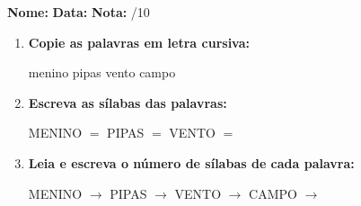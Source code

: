 \begin{exercicio}



\noindent\textbf{Nome:} \underline{\hspace{3.2cm}} \quad \textbf{Data:} \underline{\hspace{1.6cm}} \quad \textbf{Nota:} \underline{\hspace{0.9cm}}/10


\begin{enumerate}

  \item \textbf{Copie as palavras em letra cursiva:}
  \begin{center}
  menino \quad pipas \quad vento \quad campo
  \end{center}
  \begin{center}
  \underline{\hspace{2.4cm}} \quad \underline{\hspace{2.4cm}} \quad \underline{\hspace{2.4cm}} \quad \underline{\hspace{2.4cm}}
  \end{center}

  \item \textbf{Escreva as sílabas das palavras:}
  \begin{center}
  MENINO $=$ \underline{\hspace{1.5cm}} \underline{\hspace{1.5cm}} \quad PIPAS $=$ \underline{\hspace{1.5cm}} \underline{\hspace{1.5cm}} \quad VENTO $=$ \underline{\hspace{1.5cm}} \underline{\hspace{1.5cm}}
  \end{center}

  \item \textbf{Leia e escreva o número de sílabas de cada palavra:}
  \begin{center}
  MENINO $\rightarrow$ \underline{\hspace{0.9cm}} \quad PIPAS $\rightarrow$ \underline{\hspace{0.9cm}} \quad VENTO $\rightarrow$ \underline{\hspace{0.9cm}} \quad CAMPO $\rightarrow$ \underline{\hspace{0.9cm}}
  \end{center}


\end{enumerate}
\end{exercicio}
